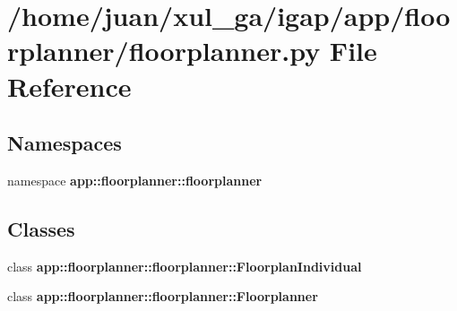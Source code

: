 \section{/home/juan/xul\_\-ga/igap/app/floorplanner/floorplanner.py File Reference}
\label{floorplanner_8py}
\subsection*{Namespaces}
\begin{CompactItemize}
\item 
namespace {\bf app::floorplanner::floorplanner}
\end{CompactItemize}
\subsection*{Classes}
\begin{CompactItemize}
\item 
class {\bf app::floorplanner::floorplanner::FloorplanIndividual}
\item 
class {\bf app::floorplanner::floorplanner::Floorplanner}
\end{CompactItemize}
